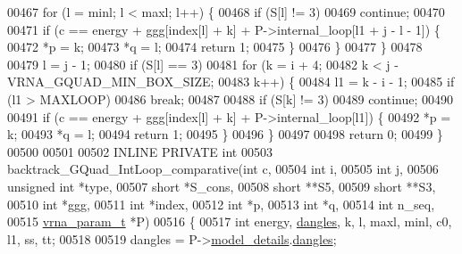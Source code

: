 \begin{DoxyCode}
00467     \textcolor{keywordflow}{for} (l = minl; l < maxl; l++) \{
00468       \textcolor{keywordflow}{if} (S[l] != 3)
00469         \textcolor{keywordflow}{continue};
00470 
00471       \textcolor{keywordflow}{if} (c == energy + ggg[index[l] + k] + P->internal\_loop[l1 + j - l - 1]) \{
00472         *p  = k;
00473         *q  = l;
00474         \textcolor{keywordflow}{return} 1;
00475       \}
00476     \}
00477   \}
00478 
00479   l = j - 1;
00480   \textcolor{keywordflow}{if} (S[l] == 3)
00481     \textcolor{keywordflow}{for} (k = i + 4;
00482          k < j - VRNA\_GQUAD\_MIN\_BOX\_SIZE;
00483          k++) \{
00484       l1 = k - i - 1;
00485       \textcolor{keywordflow}{if} (l1 > MAXLOOP)
00486         \textcolor{keywordflow}{break};
00487 
00488       \textcolor{keywordflow}{if} (S[k] != 3)
00489         \textcolor{keywordflow}{continue};
00490 
00491       \textcolor{keywordflow}{if} (c == energy + ggg[index[l] + k] + P->internal\_loop[l1]) \{
00492         *p  = k;
00493         *q  = l;
00494         \textcolor{keywordflow}{return} 1;
00495       \}
00496     \}
00497 
00498   \textcolor{keywordflow}{return} 0;
00499 \}
00500 
00501 
00502 INLINE PRIVATE \textcolor{keywordtype}{int}
00503 backtrack\_GQuad\_IntLoop\_comparative(\textcolor{keywordtype}{int}           c,
00504                                     \textcolor{keywordtype}{int}           i,
00505                                     \textcolor{keywordtype}{int}           j,
00506                                     \textcolor{keywordtype}{unsigned} \textcolor{keywordtype}{int}  *type,
00507                                     \textcolor{keywordtype}{short}         *S\_cons,
00508                                     \textcolor{keywordtype}{short}         **S5,
00509                                     \textcolor{keywordtype}{short}         **S3,
00510                                     \textcolor{keywordtype}{int}           *ggg,
00511                                     \textcolor{keywordtype}{int}           *index,
00512                                     \textcolor{keywordtype}{int}           *p,
00513                                     \textcolor{keywordtype}{int}           *q,
00514                                     \textcolor{keywordtype}{int}           n\_seq,
00515                                     \hyperlink{group__energy__parameters_structvrna__param__s}{vrna\_param\_t}  *P)
00516 \{
00517   \textcolor{keywordtype}{int} energy, \hyperlink{group__model__details_ga72b511ed1201f7e23ec437e468790d74}{dangles}, k, l, maxl, minl, c0, l1, ss, tt;
00518 
00519   dangles = P->\hyperlink{group__energy__parameters_a7b84353eb9075c595bad4ceb871bcae7}{model\_details}.\hyperlink{group__model__details_adcda4ff2ea77748ae0e8700288282efc}{dangles};

\end{DoxyCode}
